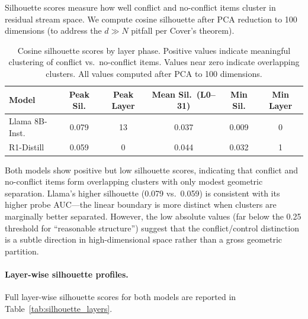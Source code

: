 \documentclass{article}
\begin{document}
Silhouette scores measure how well conflict and no-conflict items
cluster in residual stream space.  We compute cosine silhouette after
PCA reduction to 100 dimensions (to address the $d \gg N$ pitfall
per Cover's theorem).

\begin{table}[ht]
\centering
\caption{Cosine silhouette scores by layer phase.  Positive values
  indicate meaningful clustering of conflict vs.\ no-conflict items.
  Values near zero indicate overlapping clusters.  All values computed
  after PCA to 100 dimensions.}
\label{tab:silhouette}
\vspace{4pt}
\small
\begin{tabular}{lccccc}
\toprule
\textbf{Model} & \textbf{Peak Sil.} & \textbf{Peak Layer} &
  \textbf{Mean Sil.\ (L0--31)} & \textbf{Min Sil.} & \textbf{Min Layer} \\
\midrule
Llama 8B-Inst. & 0.079 & 13 & 0.037 & 0.009 & 0 \\
R1-Distill     & 0.059 & 0  & 0.044 & 0.032 & 1 \\
\bottomrule
\end{tabular}
\end{table}

\noindent Both models show positive but low silhouette scores,
indicating that conflict and no-conflict items form overlapping
clusters with only modest geometric separation.  Llama's higher
silhouette (0.079 vs.\ 0.059) is consistent with its higher probe
AUC---the linear boundary is more distinct when clusters are
marginally better separated.  However, the low absolute values
(far below the 0.25 threshold for ``reasonable structure'') suggest
that the conflict/control distinction is a subtle direction in high-dimensional
space rather than a gross geometric partition.

\paragraph{Layer-wise silhouette profiles.}
Full layer-wise silhouette scores for both models are reported in
Table~\ref{tab:silhouette_layers}.
\end{document}
